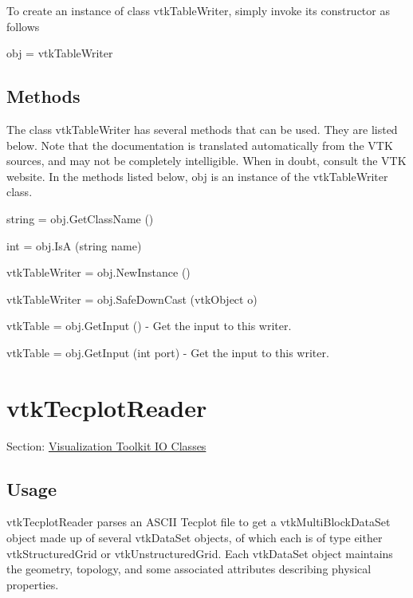 To create an instance of class vtk\-Table\-Writer, simply invoke its constructor as follows \begin{DoxyVerb}  obj = vtkTableWriter
\end{DoxyVerb}
 \hypertarget{vtkwidgets_vtkxyplotwidget_Methods}{}\subsection{Methods}\label{vtkwidgets_vtkxyplotwidget_Methods}
The class vtk\-Table\-Writer has several methods that can be used. They are listed below. Note that the documentation is translated automatically from the V\-T\-K sources, and may not be completely intelligible. When in doubt, consult the V\-T\-K website. In the methods listed below, {\ttfamily obj} is an instance of the vtk\-Table\-Writer class. 
\begin{DoxyItemize}
\item {\ttfamily string = obj.\-Get\-Class\-Name ()}  
\item {\ttfamily int = obj.\-Is\-A (string name)}  
\item {\ttfamily vtk\-Table\-Writer = obj.\-New\-Instance ()}  
\item {\ttfamily vtk\-Table\-Writer = obj.\-Safe\-Down\-Cast (vtk\-Object o)}  
\item {\ttfamily vtk\-Table = obj.\-Get\-Input ()} -\/ Get the input to this writer.  
\item {\ttfamily vtk\-Table = obj.\-Get\-Input (int port)} -\/ Get the input to this writer.  
\end{DoxyItemize}\hypertarget{vtkio_vtktecplotreader}{}\section{vtk\-Tecplot\-Reader}\label{vtkio_vtktecplotreader}
Section\-: \hyperlink{sec_vtkio}{Visualization Toolkit I\-O Classes} \hypertarget{vtkwidgets_vtkxyplotwidget_Usage}{}\subsection{Usage}\label{vtkwidgets_vtkxyplotwidget_Usage}
vtk\-Tecplot\-Reader parses an A\-S\-C\-I\-I Tecplot file to get a vtk\-Multi\-Block\-Data\-Set object made up of several vtk\-Data\-Set objects, of which each is of type either vtk\-Structured\-Grid or vtk\-Unstructured\-Grid. Each vtk\-Data\-Set object maintains the geometry, topology, and some associated attributes describing physical properties.

